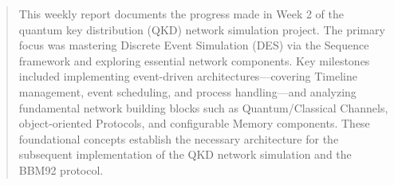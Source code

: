 \titleformat{\section}{\large\bfseries\sffamily\raggedright}{\thesection}{1em}{}
\titleformat{\subsection}{\large\bfseries\sffamily\raggedright}{\thesubsection}{1em}{}
\titleformat{\subsubsection}{\normalsize\bfseries\sffamily\raggedright}{\thesubsubsection}{1em}{}














\begin{abstract}
    \noindent
    This weekly report documents the progress made in Week 2 of the quantum key distribution (QKD) network simulation project. The primary focus was mastering Discrete Event Simulation (DES) via the Sequence framework and exploring essential network components. Key milestones included implementing event-driven architectures—covering Timeline management, event scheduling, and process handling—and analyzing fundamental network building blocks such as Quantum/Classical Channels, object-oriented Protocols, and configurable Memory components. These foundational concepts establish the necessary architecture for the subsequent implementation of the QKD network simulation and the BBM92 protocol.
\end{abstract}
\newpage

\renewcommand{\baselinestretch}{1}\normalsize
\tableofcontents
\renewcommand{\baselinestretch}{1}\normalsize
\thispagestyle{fancy}
\newpage


